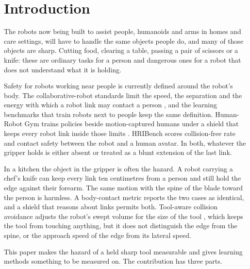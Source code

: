 \documentclass[11pt,letterpaper]{article}
\begin{document}
\section{Introduction}
The robots now being built to assist people, humanoids and arms in homes and care settings, will have to handle the same objects people do, and many of those objects are sharp. Cutting food, clearing a table, passing a pair of scissors or a knife: these are ordinary tasks for a person and dangerous ones for a robot that does not understand what it is holding.

Safety for robots working near people is currently defined around the robot's body. The collaborative-robot standards limit the speed, the separation and the energy with which a robot link may contact a person \cite{iso10218,iso15066,haddadin2009requirements}, and the learning benchmarks that train robots next to people keep the same definition. Human-Robot Gym \cite{thumm2024humanrobotgym} trains policies beside motion-captured humans under a shield that keeps every robot link inside those limits \cite{thumm2022provably}. HRIBench \cite{liu2026hribench} scores collision-free rate and contact safety between the robot and a human avatar. In both, whatever the gripper holds is either absent or treated as a blunt extension of the last link.

In a kitchen the object in the gripper is often the hazard. A robot carrying a chef's knife can keep every link ten centimetres from a person and still hold the edge against their forearm. The same motion with the spine of the blade toward the person is harmless. A body-contact metric reports the two cases as identical, and a shield that reasons about links permits both. Tool-aware collision avoidance adjusts the robot's swept volume for the size of the tool \cite{toolaware2025collision}, which keeps the tool from touching anything, but it does not distinguish the edge from the spine, or the approach speed of the edge from its lateral speed.

This paper makes the hazard of a held sharp tool measurable and gives learning methods something to be measured on. The contribution has three parts.
\end{document}
